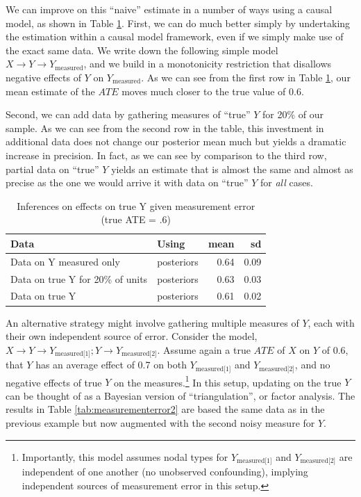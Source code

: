 \documentclass[
  12pt,
]{book}
\begin{document}
We can improve on this ``naive'' estimate in a number of ways using a causal model, as shown in Table \ref{tab:measurmenterror}. First, we can do much better simply by undertaking the estimation within a causal model framework, even if we simply make use of the exact same data. We write down the following simple model \(X \rightarrow Y \rightarrow Y_\text{measured}\), and we build in a monotonicity restriction that disallows negative effects of \(Y\) on \(Y_{\text{measured}}\). As we can see from the first row in Table \ref{tab:measurmenterror}, our mean estimate of the \(ATE\) moves much closer to the true value of 0.6.

Second, we can add data by gathering measures of ``true'' \(Y\) for 20\% of our sample. As we can see from the second row in the table, this investment in additional data does not change our posterior mean much but yields a dramatic increase in precision. In fact, as we can see by comparison to the third row, partial data on ``true'' \(Y\) yields an estimate that is almost the same and almost as precise as the one we would arrive it with data on ``true'' \(Y\) for \emph{all} cases.

\begin{table}

\caption{\label{tab:measurmenterror}Inferences on effects on true Y given measurement error (true ATE = .6)}
\centering
\begin{tabular}[t]{l|l|r|r}
\hline
Data & Using & mean & sd\\
\hline
Data on Y measured only & posteriors & 0.64 & 0.09\\
\hline
Data on true Y for 20\% of units & posteriors & 0.63 & 0.03\\
\hline
Data on true Y & posteriors & 0.61 & 0.02\\
\hline
\end{tabular}
\end{table}

An alternative strategy might involve gathering multiple measures of \(Y\), each with their own independent source of error. Consider the model, \(X \rightarrow Y \rightarrow Y_\text{measured[1]}; Y \rightarrow Y_\text{measured[2]}\). Assume again a true \(ATE\) of \(X\) on \(Y\) of 0.6, that \(Y\) has an average effect of 0.7 on both \(Y_\text{measured[1]}\) and \(Y_\text{measured[2]}\), and no negative effects of true \(Y\) on the measures.\footnote{Importantly, this model assumes nodal types for \(Y_\text{measured[1]}\) and \(Y_\text{measured[2]}\) are independent of one another (no unobserved confounding), implying independent sources of measurement error in this setup.} In this setup, updating on the true \(Y\) can be thought of as a Bayesian version of ``triangulation'', or factor analysis. The results in Table \ref{tab:measurementerror2} are based the same data as in the previous example but now augmented with the second noisy measure for \(Y\).
\end{document}
